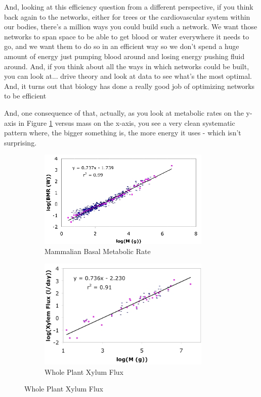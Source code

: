 \documentclass[]{article}
\begin{document}
And, looking at this efficiency question
from a different perspective,
if you think back again to the networks,
either for trees or the cardiovascular
system within our bodies,
there's a million ways
you could build such a network.
We want those networks to span space
to be able to get blood or water
everywhere it needs to go,
and we want them to do so
in an efficient way
so we don't spend
a huge amount of energy
just pumping blood around
and losing energy pushing fluid around.
And, if you think about all the ways
in which networks could be built,
you can look at... drive theory
and look at data
to see what's the most optimal.
And, it turns out that biology
has done a really good job
of optimizing networks to be efficient

And, one consequence of that,
actually, as you look at metabolic rates
on the y-axis in Figure \ref {fig:MammalianBasalMetabolicRate}
versus mass on the x-axis,
you see a very clean systematic pattern
where, the bigger something is,
the more energy it uses -
which isn't surprising.

\begin{figure}[H]
	\caption[Metabolic rate depends on optimized networks and body size]{Metabolic rate depends on optimized networks and body size\cite{savage2004predominance}}
	\begin{subfigure}[p]{0.45\textwidth}
		\caption{Mammalian Basal Metabolic Rate}\label{fig:MammalianBasalMetabolicRate}
		\includegraphics[width=0.9\textwidth]{MammalianBasalMetabolicRate}
	\end{subfigure}
	\begin{subfigure}[p]{0.45\textwidth}
		\caption{Whole Plant Xylum Flux}\label{fig:WholePlantXylumFlux}
		\includegraphics[width=0.9\textwidth]{WholePlantXylumFlux}
	\end{subfigure}
\end{figure}
\end{document}
